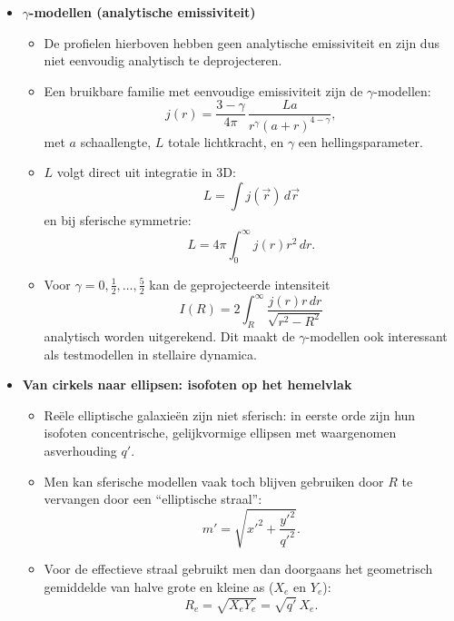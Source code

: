\documentclass[10pt,a4paper]{article}
\renewenvironment{equation}{\begin{equation*}}{\end{equation*}}
\begin{document}
\begin{itemize}
  \item \textbf{$\gamma$-modellen (analytische emissiviteit)}
  \begin{itemize}
    \item De profielen hierboven hebben geen analytische emissiviteit en zijn dus niet eenvoudig analytisch te deprojecteren.
    \item Een bruikbare familie met eenvoudige emissiviteit zijn de $\gamma$-modellen:
    \begin{equation}
      j(r)=\frac{3-\gamma}{4\pi}\,\frac{La}{r^{\gamma}(a+r)^{4-\gamma}},
      \tag{2.48}
    \end{equation}
    met $a$ schaallengte, $L$ totale lichtkracht, en $\gamma$ een hellingsparameter.
    \item $L$ volgt direct uit integratie in 3D:
    \begin{equation}
      L=\int j(\vec{r})\,d\vec{r}
      \tag{2.49}
    \end{equation}
    en bij sferische symmetrie:
    \begin{equation}
      L=4\pi\int_0^\infty j(r)r^2\,dr.
      \tag{2.50}
    \end{equation}
    \item Voor $\gamma=0,\frac{1}{2},\ldots,\frac{5}{2}$ kan de geprojecteerde intensiteit
    \begin{equation}
      I(R)=2\int_R^\infty \frac{j(r)r\,dr}{\sqrt{r^2-R^2}}
      \tag{2.51}
    \end{equation}
    analytisch worden uitgerekend. Dit maakt de $\gamma$-modellen ook interessant als testmodellen in stellaire dynamica.
  \end{itemize}

  \item \textbf{Van cirkels naar ellipsen: isofoten op het hemelvlak}
  \begin{itemize}
    \item Reële elliptische galaxieën zijn niet sferisch: in eerste orde zijn hun isofoten concentrische, gelijkvormige ellipsen met waargenomen asverhouding $q'$.
    \item Men kan sferische modellen vaak toch blijven gebruiken door $R$ te vervangen door een ``elliptische straal'':
    \begin{equation}
      m'=\sqrt{x'^2+\frac{y'^2}{q'^2}}.
      \tag{2.52}
    \end{equation}
    \item Voor de effectieve straal gebruikt men dan doorgaans het geometrisch gemiddelde van halve grote en kleine as ($X_e$ en $Y_e$):
    \begin{equation}
      R_e=\sqrt{X_eY_e}=\sqrt{q'}\,X_e.
      \tag{2.53}
    \end{equation}
  \end{itemize}


\end{itemize}
\end{document}
